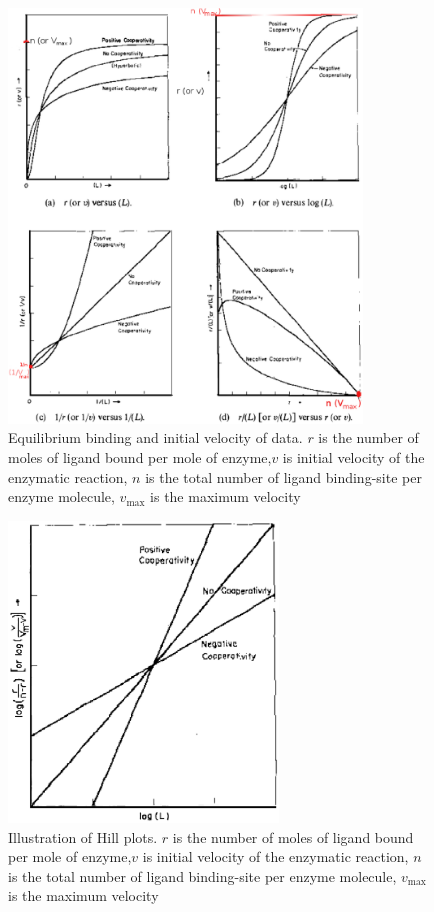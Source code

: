 \begin{figure}[hbt]
 \centerline{\includegraphics[height=11cm]{./images/enz_kin_curve.eps}}
\caption{Equilibrium binding and initial velocity of data. $r$ is the
  number of moles of ligand bound per mole of enzyme,$v$ is initial
  velocity of the enzymatic reaction, $n$ is the total number of
  ligand binding-site per enzyme molecule, $v_\max$ is the maximum velocity}
\label{fig:enz_kin}
\end{figure}

\begin{figure}[hbt]
 \centerline{\includegraphics[height=8cm]{./images/enz_kin_2.eps}}
 \caption{Illustration of Hill plots. $r$ is the number of moles of
   ligand bound per mole of enzyme,$v$ is initial velocity of the
   enzymatic reaction, $n$ is the total number of ligand binding-site
   per enzyme molecule, $v_\max$ is the maximum velocity}
\label{fig:enz_kin_2}
\end{figure}

